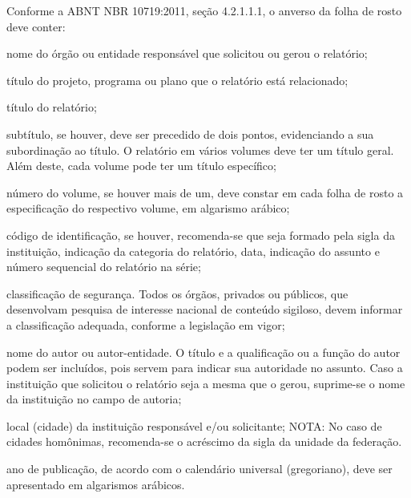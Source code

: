 \documentclass[
	12pt,				%
	twoside,			%
	a4paper,			%
	english,			%
	french,				%
	spanish,			%
	brazil,				%
	]{abntex2-inep-ufsc-relatorio}
\begin{document}
{
\ABNTEXchapterfont

\vspace*{\fill}

Conforme a ABNT NBR 10719:2011, seção 4.2.1.1.1, o anverso da folha de rosto
deve conter:

\begin{alineas}
  \item nome do órgão ou entidade responsável que solicitou ou gerou o
   relatório; 
  \item título do projeto, programa ou plano que o relatório está relacionado;
  \item título do relatório;
  \item subtítulo, se houver, deve ser precedido de dois pontos, evidenciando a
   sua subordinação ao título. O relatório em vários volumes deve ter um título
   geral. Além deste, cada volume pode ter um título específico; 
  \item número do volume, se houver mais de um, deve constar em cada folha de
   rosto a especificação do respectivo volume, em algarismo arábico; 
  \item código de identificação, se houver, recomenda-se que seja formado
   pela sigla da instituição, indicação da categoria do relatório, data,
   indicação do assunto e número sequencial do relatório na série; 
  \item classificação de segurança. Todos os órgãos, privados ou públicos, que
   desenvolvam pesquisa de interesse nacional de conteúdo sigiloso, devem
    informar a classificação adequada, conforme a legislação em vigor; 
  \item nome do autor ou autor-entidade. O título e a qualificação ou a função
   do autor podem ser incluídos, pois servem para indicar sua autoridade no
   assunto. Caso a instituição que solicitou o relatório seja a mesma que o
   gerou, suprime-se o nome da instituição no campo de autoria; 
  \item local (cidade) da instituição responsável e/ou solicitante; NOTA: No
   caso de cidades homônimas, recomenda-se o acréscimo da sigla da unidade da
   federação.
  \item ano de publicação, de acordo com o calendário universal (gregoriano),
  deve ser apresentado em algarismos arábicos.
\end{alineas}

\vspace*{\fill}
}


\end{document}
